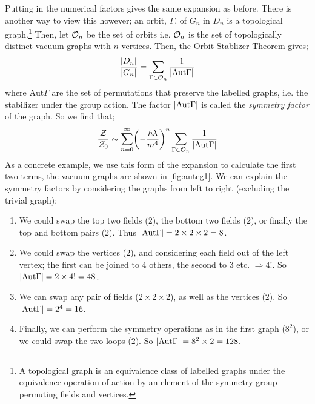 Putting in the numerical factors gives the same expansion as before. There is another way to view this however; an orbit, $\Gamma$, of $G_n$ in $D_n$ is a topological graph.\footnote{A topological graph is an equivalence class of labelled graphs under the equivalence operation of action by an element of the symmetry group permuting fields and vertices.} Then, let $\mathcal{O}_n$ be the set of orbits i.e. $\mathcal{O}_n$ is the set of topologically distinct vacuum graphs with $n$ vertices. Then, the Orbit-Stablizer Theorem gives;\footnotemark
{}
\begin{equation}
\label{eq:aut}
\frac{\abs{D_n}}{\abs{G_n}} = \sum_{\Gamma \in \mO_n}{\frac{1}{\abs{\text{Aut}\Gamma}}}
\end{equation}
where $\text{Aut}\Gamma$ are the set of permutations that preserve the labelled graphs, i.e. the stabilizer under the group action. The factor $\abs{\text{Aut}\Gamma}$ is called the \emph{symmetry factor} of the graph. So we find that;
\begin{equation}
\frac{\mZ}{\mZ_0} \sim \sum_{n = 0}^{\infty}\left(-\frac{\hbar \lambda}{m^4}\right)^n \sum_{\Gamma \in \mO_n}{\frac{1}{\abs{\text{Aut}\Gamma}}}
\end{equation}
As a concrete example, we use this form of the expansion to calculate the first two terms, the vacuum graphs are shown in \autoref{fig:auteg1}. We can explain the symmetry factors by considering the graphs from left to right (excluding the trivial graph);
\begin{enumerate}
\item We could swap the top two fields ($2$), the bottom two fields ($2$), or finally the top and bottom pairs ($2$). Thus $\abs{\text{Aut}\Gamma} = 2\times 2 \times 2 = 8$.
\item We could swap the vertices ($2$), and considering each field out of the left vertex; the first can be joined to $4$ others, the second to $3$ etc. $\Rightarrow 4!$. So $\abs{\text{Aut}\Gamma} = 2 \times 4! = 48$.
\item We can swap any pair of fields ($2\times 2\times 2$), as well as the vertices ($2$). So $\abs{\text{Aut}\Gamma} = 2^4 = 16$.
\item Finally, we can perform the symmetry operations as in the first graph ($8^2$), or we could swap the two loops ($2$). So $\abs{\text{Aut}\Gamma} = 8^2 \times 2 = 128$.
\end{enumerate}
